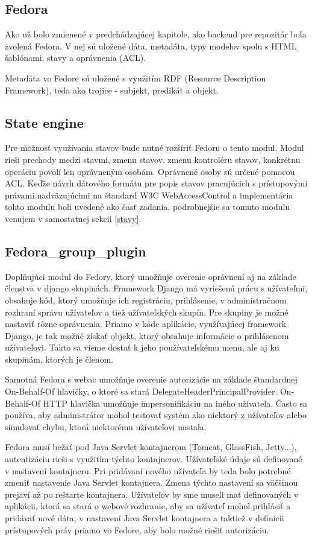 \documentclass[thesis=M,slovak]{FITthesis}[2013/05/06]
\begin{document}
\subsection{Fedora}
Ako už bolo zmienené v predchádzajúcej kapitole, ako backend pre repozitár bola zvolená Fedora. V nej sú uložené dáta, metadáta, typy modelov spolu s HTML šablónami, stavy a oprávnenia (ACL).

Metadáta vo Fedore sú uložené s využitím RDF (Resource Description Framework), teda ako trojice - subjekt, predikát a objekt.

\subsection{State engine}
Pre možnosť využívania stavov bude nutné rozšíriť Fedoru o tento modul. Modul rieši prechody medzi stavmi, zmenu stavov, zmenu kontroléru stavov, konkrétnu operáciu povolí len oprávneným osobám. Oprávnené osoby sú určené pomocou ACL. Keďže návrh dátového formátu pre popis stavov pracujúcich s prístupovými právami nadväzujúcimi na štandard W3C WebAccessControl a implementácia tohto modulu boli uvedené ako časť zadania, podrobnejšie sa tomuto modulu venujem v samostatnej sekcii \ref{stavy}.

\subsection{Fedora\_group\_plugin}
Doplňujúci modul do Fedory, ktorý umožňuje overenie oprávnení aj na základe členstva v django skupinách. Framework Django má vyriešenú prácu s užívateľmi, obsahuje kód, ktorý umožňuje ich registráciu, prihlásenie, v administračnom rozhraní správu užívateľov a tiež užívateľských skupín. Pre skupiny je možné nastaviť rôzne oprávnenia. Priamo v kóde aplikácie, využívajúcej framework Django, je tak možné získať objekt, ktorý obsahuje informácie o prihlásenom užívateľovi. Takto sa vieme dostať k jeho používateľskému menu, ale aj ku skupinám, ktorých je členom. 

Samotná Fedora s webac umožňuje overenie autorizácie na základe štandardnej On-Behalf-Of hlavičky, o ktoré sa stará DelegateHeaderPrincipalProvider. On-Behalf-Of HTTP hlavička umožňuje impersonifikáciu na iného užívateľa. Často sa používa, aby administrátor mohol testovať systém ako niektorý z užívateľov alebo simulovať chybu, ktorá niektorému užívateľovi nastala. 

Fedora musí bežať pod Java Servlet kontajnerom (Tomcat, GlassFish, Jetty...), autentizáciu rieši s využitím týchto kontajnerov. Užívateľské údaje sú definované v nastavení kontajneru. Pri pridávaní nového užívateľa by teda bolo potrebné zmeniť nastavenie Java Servlet kontajnera. Zmena týchto nastavení sa väčšinou prejaví až po reštarte kontajnera. Užívateľov by sme museli mať definovaných v aplikácii, ktorá sa stará o webové rozhranie, aby sa užívateľ mohol prihlásiť a pridávať nové dáta, v nastavení Java Servlet kontajnera a taktiež v definicii prístupových práv priamo vo Fedore, aby bolo možné riešiť autorizáciu.
\end{document}
